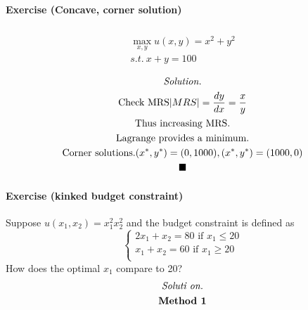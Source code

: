 \documentclass{article}
\newcommand{\tx}[1]{\text{{#1}}}
\begin{document}
\paragraph{Exercise (Concave, corner solution)}
\begin{multline*}
	\\
	\max_{x, y} u(x,y) = x^2 + y^2 \\
	s.t.\ x + y = 100 \\
\end{multline*}
\begin{multline*}
	\emph{Solution.} \\
	\tx{Check MRS} \vert MRS \vert = \frac{dy}{dx} = \frac{x}{y} \\
	\tx{Thus increasing MRS.} \\
	\tx{Lagrange provides a minimum.} \\
	\tx{Corner solutions.} (x^*, y^*) = (0, 1000), (x^*, y^*) = (1000, 0)\\
	\blacksquare
\end{multline*}

\paragraph{Exercise (kinked budget constraint)} Suppose $u(x_1, x_2) = x_1^2 x_2^2$ and the budget constraint is defined as 
\[
	\begin{cases}
		2x_1 + x_2 = 80 \tx{ if } x_1 \leq 20 \\
		x_1 + x_2 = 60 \tx{ if } x_1 \geq 20 \\
	\end{cases}
\]
How does the optimal $x_1$ compare to 20?
\begin{multline*}
	\emph{Soluti on.} \\
	\textbf{Method 1} \\
\end{multline*}
\end{document}
